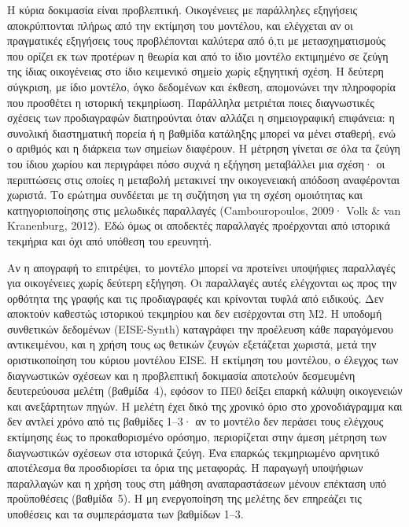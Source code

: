 \documentclass[11pt,a4paper]{article}
\begin{document}
Η κύρια δοκιμασία είναι προβλεπτική. Οικογένειες με παράλληλες εξηγήσεις αποκρύπτονται πλήρως από την εκτίμηση του μοντέλου, και ελέγχεται αν οι πραγματικές εξηγήσεις τους προβλέπονται καλύτερα από ό,τι με μετασχηματισμούς που ορίζει εκ των προτέρων η θεωρία και από το ίδιο μοντέλο εκτιμημένο σε ζεύγη της ίδιας οικογένειας στο ίδιο κειμενικό σημείο χωρίς εξηγητική σχέση. Η δεύτερη σύγκριση, με ίδιο μοντέλο, όγκο δεδομένων και έκθεση, απομονώνει την πληροφορία που προσθέτει η ιστορική τεκμηρίωση. Παράλληλα μετριέται ποιες διαγνωστικές σχέσεις των προδιαγραφών διατηρούνται όταν αλλάζει η σημειογραφική επιφάνεια: η συνολική διαστηματική πορεία ή η βαθμίδα κατάληξης μπορεί να μένει σταθερή, ενώ ο αριθμός και η διάρκεια των σημείων διαφέρουν. Η μέτρηση γίνεται σε όλα τα ζεύγη του ίδιου χωρίου και περιγράφει πόσο συχνά η εξήγηση μεταβάλλει μια σχέση· οι περιπτώσεις στις οποίες η μεταβολή μετακινεί την οικογενειακή απόδοση αναφέρονται χωριστά. Το ερώτημα συνδέεται με τη συζήτηση για τη σχέση ομοιότητας και κατηγοριοποίησης στις μελωδικές παραλλαγές (Cambouropoulos, 2009· Volk \& van Kranenburg, 2012). Εδώ όμως οι αποδεκτές παραλλαγές προέρχονται από ιστορικά τεκμήρια και όχι από υπόθεση του ερευνητή.

Αν η απογραφή το επιτρέψει, το μοντέλο μπορεί να προτείνει υποψήφιες παραλλαγές για οικογένειες χωρίς δεύτερη εξήγηση. Οι παραλλαγές αυτές ελέγχονται ως προς την ορθότητα της γραφής και τις προδιαγραφές και κρίνονται τυφλά από ειδικούς. Δεν αποκτούν καθεστώς ιστορικού τεκμηρίου και δεν εισέρχονται στη M2. Η υποδομή συνθετικών δεδομένων (EISE-Synth) καταγράφει την προέλευση κάθε παραγόμενου αντικειμένου, και η χρήση τους ως θετικών ζευγών εξετάζεται χωριστά, μετά την οριστικοποίηση του κύριου μοντέλου EISE. Η εκτίμηση του μοντέλου, ο έλεγχος των διαγνωστικών σχέσεων και η προβλεπτική δοκιμασία αποτελούν δεσμευμένη δευτερεύουσα μελέτη (βαθμίδα~4), εφόσον το ΠΕ0 δείξει επαρκή κάλυψη οικογενειών και ανεξάρτητων πηγών. Η μελέτη έχει δικό της χρονικό όριο στο χρονοδιάγραμμα και δεν αντλεί χρόνο από τις βαθμίδες 1--3· αν το μοντέλο δεν περάσει τους ελέγχους εκτίμησης έως το προκαθορισμένο ορόσημο, περιορίζεται στην άμεση μέτρηση των διαγνωστικών σχέσεων στα ιστορικά ζεύγη. Ένα επαρκώς τεκμηριωμένο αρνητικό αποτέλεσμα θα προσδιορίσει τα όρια της μεταφοράς. Η παραγωγή υποψήφιων παραλλαγών και η χρήση τους στη μάθηση αναπαραστάσεων μένουν επέκταση υπό προϋποθέσεις (βαθμίδα~5). Η μη ενεργοποίηση της μελέτης δεν επηρεάζει τις υποθέσεις και τα συμπεράσματα των βαθμίδων 1--3.
\end{document}
